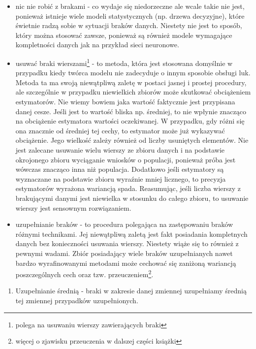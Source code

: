 \documentclass[]{book}
\providecommand{\tightlist}{%
  \setlength{\itemsep}{0pt}\setlength{\parskip}{0pt}}
\let\rmarkdownfootnote\footnote%
\def\footnote{\protect\rmarkdownfootnote}
\theoremstyle{plain}
\theoremstyle{definition}
\theoremstyle{definition}
\theoremstyle{definition}
\theoremstyle{definition}
\theoremstyle{remark}
\begin{document}
\begin{itemize}
\tightlist
\item
  nic nie robić z brakami - co wydaje się niedorzeczne ale wcale takie nie jest, ponieważ istnieje wiele modeli statystycznych (np. drzewa decyzyjne), które świetnie radzą sobie w sytuacji braków danych. Niestety nie jest to sposób, który można stosować zawsze, ponieważ są również modele wymagające kompletności danych jak na przykład sieci neuronowe.
\item
  usuwać braki wierszami\footnote{polega na usuwaniu wierszy zawierających braki} - to metoda, która jest stosowana domyślnie w przypadku kiedy twórca modelu nie zadecyduje o innym sposobie obsługi luk. Metoda ta ma swoją niewątpliwą zaletę w postaci jasnej i prostej procedury, ale szczególnie w przypadku niewielkich zbiorów może skutkować obciążeniem estymatorów. Nie wiemy bowiem jaka wartość faktycznie jest przypisana danej cesze. Jeśli jest to wartość bliska np. średniej, to nie wpłynie znacząco na obciążenie estymatora wartości oczekiwanej. W przypadku, gdy różni się ona znacznie od średniej tej cechy, to estymator może już wykazywać obciążenie. Jego wielkość zależy również od liczby usuniętych elementów. Nie jest zalecane usuwanie wielu wierszy ze zbioru danych i na podstawie okrojonego zbioru wyciąganie wniosków o populacji, ponieważ próba jest wówczas znacząco inna niż populacja. Dodatkowo jeśli estymatory są wyznaczane na podstawie zbioru wyraźnie mniej licznego, to precyzja estymatorów wyrażona wariancją spada. Reasumując, jeśli liczba wierszy z brakującymi danymi jest niewielka w stosunku do całego zbioru, to usuwanie wierszy jest sensownym rozwiązaniem.
\item
  uzupełnianie braków - to procedura polegająca na zastępowaniu braków różnymi technikami. Jej niewątpliwą zaletą jest fakt posiadania kompletnych danych bez konieczności usuwania wierszy. Niestety wiąże się to również z pewnymi wadami. Zbiór posiadający wiele braków uzupełnianych nawet bardzo wyrafinowanymi metodami może cechować się zaniżoną wariancją poszczególnych cech oraz tzw. przeuczeniem\footnote{więcej o zjawisku przeuczenia w dalszej części książki}.
\end{itemize}

\begin{enumerate}
\def\labelenumi{\arabic{enumi}.}
\tightlist
\item
  Uzupełnianie średnią - braki w zakresie danej zmiennej uzupełniamy średnią tej zmiennej przypadków uzupełnionych.
\end{enumerate}
\end{document}
